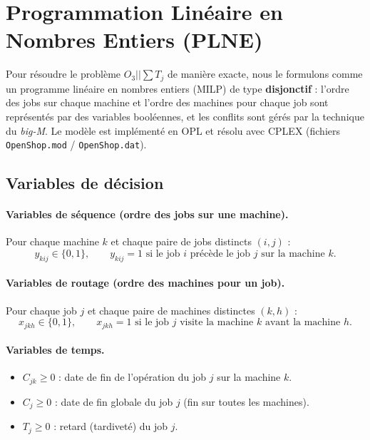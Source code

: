 \section{Programmation Linéaire en Nombres Entiers (PLNE)}

Pour résoudre le problème $O_3 || \sum T_j$ de manière exacte, nous le formulons comme un programme linéaire en nombres entiers (MILP) de type \textbf{disjonctif} : l'ordre des jobs sur chaque machine et l'ordre des machines pour chaque job sont représentés par des variables booléennes, et les conflits sont gérés par la technique du \textit{big-M}. Le modèle est implémenté en OPL et résolu avec CPLEX (fichiers \texttt{OpenShop.mod} / \texttt{OpenShop.dat}).

\subsection{Variables de décision}

\paragraph{Variables de séquence (ordre des jobs sur une machine).} Pour chaque machine $k$ et chaque paire de jobs distincts $(i, j)$ :
\begin{equation}
    y_{kij} \in \{0, 1\}, \qquad y_{kij} = 1 \text{ si le job } i \text{ précède le job } j \text{ sur la machine } k.
\end{equation}

\paragraph{Variables de routage (ordre des machines pour un job).} Pour chaque job $j$ et chaque paire de machines distinctes $(k, h)$ :
\begin{equation}
    x_{jkh} \in \{0, 1\}, \qquad x_{jkh} = 1 \text{ si le job } j \text{ visite la machine } k \text{ avant la machine } h.
\end{equation}

\paragraph{Variables de temps.}
\begin{itemize}
    \item $C_{jk} \geq 0$ : date de fin de l'opération du job $j$ sur la machine $k$.
    \item $C_{j} \geq 0$ : date de fin globale du job $j$ (fin sur toutes les machines).
    \item $T_{j} \geq 0$ : retard (tardiveté) du job $j$.
\end{itemize}

